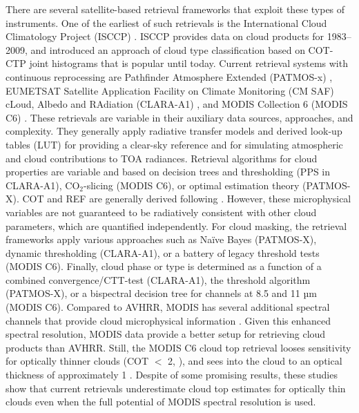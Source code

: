 There are several satellite-based retrieval frameworks that exploit these types of instruments. One of the earliest of such retrievals is the International Cloud Climatology Project (ISCCP) \citep{Rossow99}. ISCCP provides data on cloud products for 1983--2009, and introduced an approach of cloud type classification based on COT-CTP joint histograms that is popular until today. Current retrieval systems with continuous reprocessing are Pathfinder Atmosphere Extended (PATMOS-x) \citep{Heidinger09,Heidinger12}, EUMETSAT Satellite Application Facility on Climate Monitoring (CM SAF) cLoud, Albedo and RAdiation (CLARA-A1) \citep{Karlsson13}, and MODIS Collection 6 (MODIS C6) \citep{Platnick17}. These retrievals are variable in their auxiliary data sources, approaches, and complexity. They generally apply radiative transfer models and derived look-up tables (LUT) for providing a clear-sky reference and for simulating atmospheric and cloud contributions to TOA radiances. Retrieval algorithms for cloud properties are variable and based on decision trees and thresholding (PPS in CLARA-A1), CO$_{2}$-slicing (MODIS C6), or optimal estimation theory (PATMOS-X). COT and REF are generally derived following \citet{Nakajima90}. However, these microphysical variables are not guaranteed to be radiatively consistent with other cloud parameters, which are quantified independently. For cloud masking, the retrieval frameworks apply various approaches such as Na\"{i}ve Bayes (PATMOS-X), dynamic thresholding (CLARA-A1), or a battery of legacy threshold tests (MODIS C6). Finally, cloud phase or type is determined as a function of a combined convergence/CTT-test (CLARA-A1), the \citet{Pavolonis05} threshold algorithm (PATMOS-X), or a bispectral decision tree for channels at 8.5 and 11 µm (MODIS C6). Compared to AVHRR, MODIS has several additional spectral channels that provide cloud microphysical information \citep{Platnick17}. Given this enhanced spectral resolution, MODIS data provide a better setup for retrieving cloud products than AVHRR. Still, the MODIS C6 cloud top retrieval looses sensitivity for optically thinner clouds (COT $<$ 2, \citet{Menzel10}), and sees into the cloud to an optical thickness of approximately 1 \citep{Baum12}. Despite of some promising results, these studies show that current retrievals underestimate cloud top estimates for optically thin clouds even when the full potential of MODIS spectral resolution is used.

